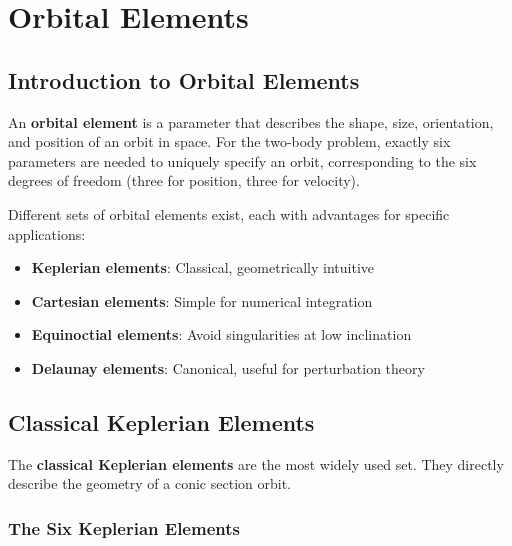 \chapter{Orbital Elements}
\label{ch:orbital_elements}

\section{Introduction to Orbital Elements}

An \textbf{orbital element} is a parameter that describes the shape, size, orientation, and position of an orbit in space. For the two-body problem, exactly six parameters are needed to uniquely specify an orbit, corresponding to the six degrees of freedom (three for position, three for velocity).

Different sets of orbital elements exist, each with advantages for specific applications:
\begin{itemize}
    \item \textbf{Keplerian elements}: Classical, geometrically intuitive
    \item \textbf{Cartesian elements}: Simple for numerical integration
    \item \textbf{Equinoctial elements}: Avoid singularities at low inclination
    \item \textbf{Delaunay elements}: Canonical, useful for perturbation theory
\end{itemize}

\section{Classical Keplerian Elements}

The \textbf{classical Keplerian elements} are the most widely used set. They directly describe the geometry of a conic section orbit.

\subsection{The Six Keplerian Elements}

